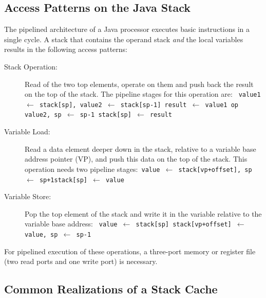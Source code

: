 \subsection{Access Patterns on the Java Stack}
\label{subsec:access}

The pipelined architecture of a Java processor executes basic
instructions in a single cycle. A stack that contains the operand
stack \emph{and} the local variables results in the following access
patterns:
%
\begin{description}
\item[Stack Operation:] Read of the two top elements, operate on them and
push back the result on the top of the stack. The pipeline stages
for this operation are:\newline
\texttt{
    value1 $\leftarrow $ stack[sp], value2 $\leftarrow $ stack[sp-1]\newline
    result $\leftarrow $ value1 op value2, sp $\leftarrow $ sp-1\newline
    stack[sp] $\leftarrow $ result
}

\item[Variable Load:] Read a data element deeper down in the
    stack, relative to a variable base address pointer (VP), and
    push this data on the top of the stack. This operation needs
    two pipeline stages:\newline \texttt{ value $\leftarrow $
    stack[vp+offset], sp $\leftarrow $ sp+1\newline stack[sp]
    $\leftarrow $ value
}

\item[Variable Store:] Pop the top element of the stack and write it in
the variable relative to the variable base address:\newline
\texttt{
    value $\leftarrow $ stack[sp]\newline
    stack[vp+offset] $\leftarrow $ value, sp $\leftarrow $ sp-1
}
\end{description}
%
For pipelined execution of these operations, a three-port memory or
register file (two read ports and one write port) is necessary.

\subsection{Common Realizations of a Stack Cache}

